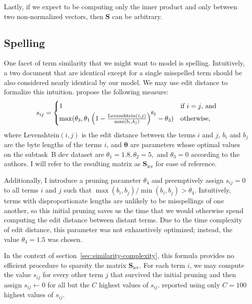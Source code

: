\documentclass[
  digital, %
  notable, %
  lof,     %
  lot,     %
  nopalatino, color
]{fithesis3}
\begin{document}
Lastly, if we expect to be computing only the inner product and only between
two non-normalized vectors, then $\mathbf S$ can be arbitrary.

\subsection{Spelling}
One facet of term similarity that we might want to model is spelling.
Intuitively, a two document that are identical except for a single misspelled
term should be also considered nearly identical by our model. We may use
edit distance to formalize this intuition.
\textcite{charletdamnati17} propose the following measure:\begin{equation}
  s_{ij} = \begin{cases}
    1 & \text{if }i = j\textrm{, and} \\
    \max(\theta_3, \theta_1\left(1-\frac{\textrm{Levenshtein}(i, j)}{\max(b_i, b_j)}\right)^{\theta_2}-\theta_3) & \index{.h1@$\theta_1$|emph}\index{.h2@$\theta_2$|emph}\index{.h3@$\theta _3$|emph}\textrm{otherwise,}
  \end{cases}
\end{equation}
where $\textrm{Levenshtein}(i, j)$ is the edit distance between the terms
$i$ and $j$, $b_i$ and $b_j$ are the byte lengths of the terms $i$,
and $\bm\theta$ are parameters whose optimal values on the
subtask~B dev dataset are $\theta_1=1.8,\theta_2=5,$ and $\theta_3=0$ according
to the authors. I will refer to the resulting matrix as $\mathbf
S_{\textrm{lev}}$ for ease of
reference.

Additionally, I introduce a pruning parameter
$\theta_4$ and preemptively assign $s_{ij}=0$ to all
terms $i$ and $j$ such that $\max(b_i, b_j) / \min(b_i, b_j) > \theta_4$.
Intuitively, terms with disproportionate lengths are unlikely to be
misspellings of one another, so this initial pruning saves us the time that we
would otherwise spend computing the edit distance between distant terms.  Due
to the time complexity of edit distance, this parameter was not exhaustively
optimized; instead, the value $\theta_4=1.5$ was chosen.

In the context of section~\ref{sec:similarity-complexity}, this formula
provides no efficient procedure to sparsity the matrix $\mathbf
S_{\textrm{lev}}$. For each term $i$,
we may compute the value $s_{ij}$ for every other term $j$ that survived the
initial pruning and then assign $s_{ij}\leftarrow 0$ for all but the
$C$ highest values of $s_{ij}$. \textcite{charletdamnati17}
reported using only $C=100$ highest values of $s_{ij}$.
\end{document}
